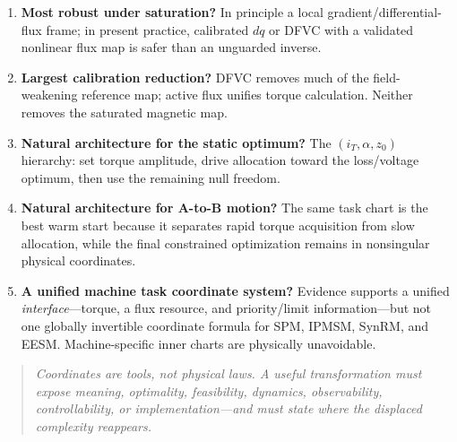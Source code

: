 \begin{enumerate}
 state-dependent task/IOFL frames cost more unless they remove substantial
 maps or calibration.
 \item \textbf{Most robust under saturation?} In principle a local
 gradient/differential-flux frame; in present practice, calibrated \(dq\) or
 DFVC with a validated nonlinear flux map is safer than an unguarded inverse.
 \item \textbf{Largest calibration reduction?} DFVC removes much of the
 field-weakening reference map; active flux unifies torque calculation.
 Neither removes the saturated magnetic map.
 \item \textbf{Natural architecture for the static optimum?} The
 \((i_T,\alpha,z_0)\) hierarchy: set torque amplitude, drive allocation toward
 the loss/voltage optimum, then use the remaining null freedom.
 \item \textbf{Natural architecture for A-to-B motion?} The same task chart is
 the best warm start because it separates rapid torque acquisition from slow
 allocation, while the final constrained optimization remains in nonsingular
 physical coordinates.
 \item \textbf{A unified machine task coordinate system?} Evidence supports a
 unified \emph{interface}---torque, a flux resource, and priority/limit
 information---but not one globally invertible coordinate formula for SPM,
 IPMSM, SynRM, and EESM. Machine-specific inner charts are physically
 unavoidable.
\end{enumerate}

\begin{quote}\itshape
Coordinates are tools, not physical laws. A useful transformation must expose
meaning, optimality, feasibility, dynamics, observability, controllability, or
implementation---and must state where the displaced complexity reappears.
\end{quote}

